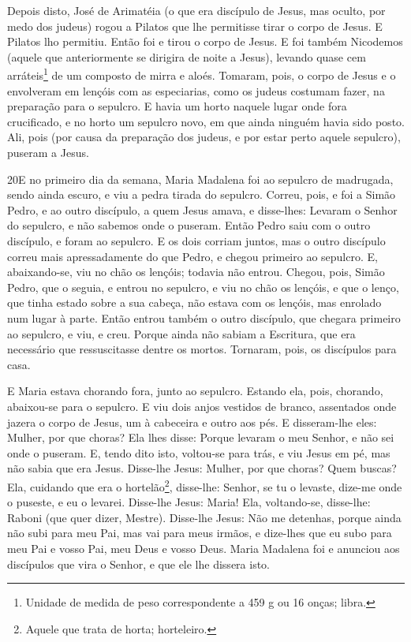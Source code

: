 Depois disto, José de Arimatéia (o que era discípulo de Jesus,
mas oculto, por medo dos judeus) rogou a Pilatos que lhe permitisse
tirar o corpo de Jesus. E Pilatos lho permitiu. Então foi e tirou o
corpo de Jesus. E foi também Nicodemos (aquele que
anteriormente se dirigira de noite a Jesus), levando quase cem
arráteis\footnote{Unidade de medida de peso correspondente a 459 g
ou 16 onças; libra.} de um composto de mirra e aloés.
Tomaram, pois, o corpo de Jesus e o envolveram em lençóis com
as especiarias, como os judeus costumam fazer, na preparação para o
sepulcro. E havia um horto naquele lugar onde fora
crucificado, e no horto um sepulcro novo, em que ainda ninguém havia
sido posto. Ali, pois (por causa da preparação dos judeus, e
por estar perto aquele sepulcro), puseram a Jesus.

\medskip

\lettrine{20} E no primeiro dia da semana, Maria Madalena foi
ao sepulcro de madrugada, sendo ainda escuro, e viu a pedra tirada
do sepulcro. Correu, pois, e foi a Simão Pedro, e ao outro
discípulo, a quem Jesus amava, e disse-lhes: Levaram o Senhor do
sepulcro, e não sabemos onde o puseram. Então Pedro saiu com o
outro discípulo, e foram ao sepulcro. E os dois corriam juntos,
mas o outro discípulo correu mais apressadamente do que Pedro, e
chegou primeiro ao sepulcro. E, abaixando-se, viu no chão os
lençóis; todavia não entrou. Chegou, pois, Simão Pedro, que o
seguia, e entrou no sepulcro, e viu no chão os lençóis, e que o
lenço, que tinha estado sobre a sua cabeça, não estava com os
lençóis, mas enrolado num lugar à parte. Então entrou também o
outro discípulo, que chegara primeiro ao sepulcro, e viu, e creu.
Porque ainda não sabiam a Escritura, que era necessário que
ressuscitasse dentre os mortos. Tornaram, pois, os discípulos
para casa.

E Maria estava chorando fora, junto ao sepulcro. Estando ela,
pois, chorando, abaixou-se para o sepulcro. E viu dois anjos
vestidos de branco, assentados onde jazera o corpo de Jesus, um à
cabeceira e outro aos pés. E disseram-lhe eles: Mulher, por
que choras? Ela lhes disse: Porque levaram o meu Senhor, e não sei
onde o puseram. E, tendo dito isto, voltou-se para trás, e
viu Jesus em pé, mas não sabia que era Jesus. Disse-lhe
Jesus: Mulher, por que choras? Quem buscas? Ela, cuidando que era o
hortelão\footnote{Aquele que trata de horta; horteleiro.},
disse-lhe: Senhor, se tu o levaste, dize-me onde o puseste, e eu o
levarei. Disse-lhe Jesus: Maria! Ela, voltando-se, disse-lhe:
Raboni (que quer dizer, Mestre). Disse-lhe Jesus: Não me
detenhas, porque ainda não subi para meu Pai, mas vai para meus
irmãos, e dize-lhes que eu subo para meu Pai e vosso Pai, meu Deus e
vosso Deus. Maria Madalena foi e anunciou aos discípulos que
vira o Senhor, e que ele lhe dissera isto.

